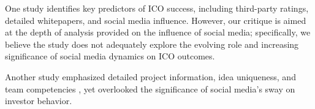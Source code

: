 \documentclass[runningheads]{llncs}
\begin{document}
One study\cite{campino2021success} identifies key predictors of ICO success, including third-party ratings, detailed whitepapers, and social media influence. However, our critique is aimed at the depth of analysis provided on the influence of social media; specifically, we believe the study does not adequately explore the evolving role and increasing significance of social media dynamics on ICO outcomes.



Another study emphasized detailed project information, idea uniqueness, and team competencies \cite{alchykava2021ico}, yet overlooked the significance of social media's sway on investor behavior.

\end{document}
